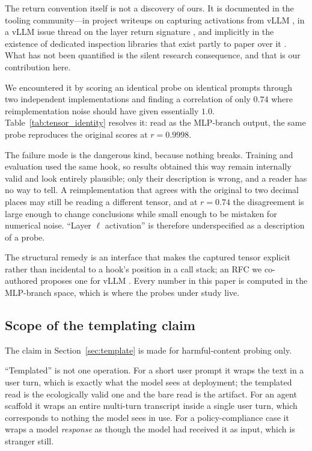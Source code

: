 The return convention itself is not a discovery of ours. It is documented in the tooling community---in project
writeups on capturing activations from vLLM \cite{nnsight2026hooks}, in a vLLM issue thread on the layer return
signature \cite{vllmissue12099}, and implicitly in the existence of dedicated inspection libraries that exist partly
to paper over it \cite{vllmlens}. What has not been quantified is the silent research consequence, and that is our
contribution here.

We encountered it by scoring an identical probe on identical prompts through two independent implementations and
finding a correlation of only $0.74$ where reimplementation noise should have given essentially $1.0$.
Table~\ref{tab:tensor_identity} resolves it: read as the MLP-branch output, the same probe reproduces the original
scores at $r = 0.9998$.



The failure mode is the dangerous kind, because nothing breaks. Training and evaluation used the same hook, so results
obtained this way remain internally valid and look entirely plausible; only their description is wrong, and a reader
has no way to tell. A reimplementation that agrees with the original to two decimal places may still be reading a
different tensor, and at $r = 0.74$ the disagreement is large enough to change conclusions while small enough to be
mistaken for numerical noise. ``Layer $\ell$ activation'' is therefore underspecified as a description of a probe.

The structural remedy is an interface that makes the captured tensor explicit rather than incidental to a hook's
position in a call stack; an RFC we co-authored proposes one for vLLM \cite{vllmrfc36998}. Every number in this paper is computed in
the MLP-branch space, which is where the probes under study live.

\subsection{Scope of the templating claim}
\label{sec:scope}

The claim in Section~\ref{sec:template} is made for harmful-content probing only.

``Templated'' is not one operation. For a short user prompt it wraps the text in a user turn, which is exactly what
the model sees at deployment; the templated read is the ecologically valid one and the bare read is the artifact. For
an agent scaffold it wraps an entire multi-turn transcript inside a single user turn, which corresponds to nothing
the model sees in use. For a policy-compliance case it wraps a model \emph{response} as though the model had received
it as input, which is stranger still.

